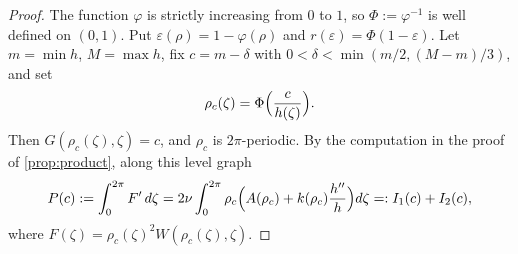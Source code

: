 \documentclass[11pt]{article}
\theoremstyle{definition}
\begin{document}
\begin{proof}
The function $\varphi$ is strictly increasing from $0$ to $1$, so
$\Phi:=\varphi^{-1}$ is well defined on $(0,1)$. Put
$\varepsilon(\rho)=1-\varphi(\rho)$ and $r(\varepsilon)=\Phi(1-\varepsilon)$.
Let $m=\min h$, $M=\max h$, fix $c=m-\delta$ with
$0<\delta<\min(m/2,(M-m)/3)$, and set
\begin{equation}
\rho_c(\zeta)=\Phi\Bigl(\frac{c}{h(\zeta)}\Bigr).
\end{equation}
Then $G(\rho_c(\zeta),\zeta)=c$, and $\rho_c$ is $2\pi$-periodic. By the
computation in the proof of \cref{prop:product}, along this level graph
\begin{equation}\label{eq:Pgen}
P(c):=\int_0^{2\pi}F'\,d\zeta
=2\nu\int_0^{2\pi}\rho_c\Bigl(A(\rho_c)+k(\rho_c)\frac{h''}{h}\Bigr)d\zeta
=:I_1(c)+I_2(c),
\end{equation}
where $F(\zeta)=\rho_c(\zeta)^2W(\rho_c(\zeta),\zeta)$.


\end{proof}
\end{document}
